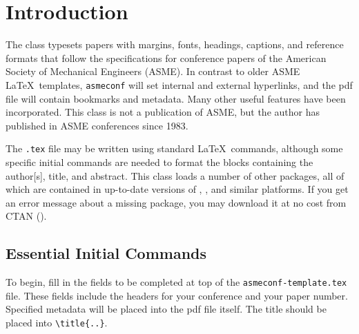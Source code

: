 \documentclass[balance,upint,subscriptcorrection,varvw,mathalfa=cal=boondoxo,spanish,french,vietnamese,russian,greek,pdf-a,fontspec,colorlinks]{asmeconf}
\begin{document}
\begin{nomenclature}



\end{nomenclature}


\section{Introduction}
The \texttt{} class typesets papers with margins, fonts, headings, captions, and reference formats that follow the specifications for conference papers of the American Society of Mechanical Engineers (ASME). In contrast to older ASME \LaTeX\ templates, \texttt{asmeconf} will set internal and external hyperlinks, and the pdf file will contain bookmarks and metadata. Many other useful features have been incorporated. This class is not a publication of ASME, but the author has published in ASME conferences since 1983. 

The \texttt{.tex} file may be written using standard \LaTeX\ commands, although some specific initial commands are needed to format the blocks containing the author[s], title, and abstract.  This class loads a number of other packages, all of which are contained in up-to-date versions of , , and similar platforms. If you get an error message about a missing package, you may download it at no cost from CTAN (). 

\subsection{Essential Initial Commands}

To begin, fill in the fields to be completed at top of the \texttt{asmeconf-template.tex} file. These fields include the headers for your conference and your paper number. Specified metadata will be placed into the pdf file itself. 
The title should be placed into \verb|\title{..}|. 
\end{document}
